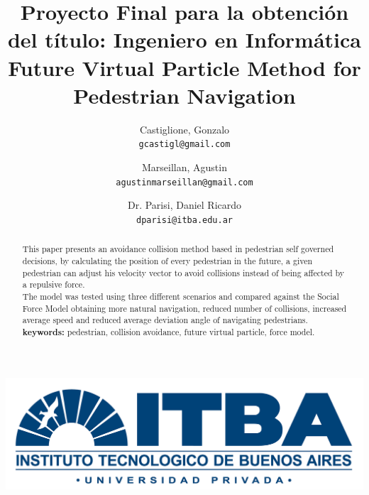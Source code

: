 \documentclass[english]{article}
\providecommand{\tabularnewline}{\\}
\begin{document}
\title{
    Proyecto Final para la obtención del título: Ingeniero en Informática
    \tabularnewline
    \large Future Virtual Particle Method for Pedestrian Navigation
}

\author{
  Castiglione, Gonzalo\\
  \texttt{gcastigl@gmail.com}
  \and
  Marseillan, Agustin\\
  \texttt{agustinmarseillan@gmail.com}
  \and
  Dr. Parisi, Daniel Ricardo \\
  \texttt{dparisi@itba.edu.ar}
}
\date{}

\maketitle

\vspace{8cm}
\begin{center}
    \includegraphics[scale=0.1]{pics/ITBA}
    \par
\end{center}

\pagebreak{}

\tableofcontents{}

\pagebreak{}

\begin{abstract}
This paper presents an avoidance collision method based in pedestrian self
governed decisions, by calculating the position of every pedestrian
in the future, a given pedestrian can adjust his velocity vector to
avoid collisions instead of being affected by a repulsive force. \\
The model was tested using three different scenarios and compared 
against the Social Force Model obtaining more natural navigation,
reduced number of collisions, increased average
speed and reduced average deviation angle of navigating pedestrians. \\
\textbf{keywords:} pedestrian, collision avoidance, future virtual
particle, force model.
\end{abstract}
\end{document}
